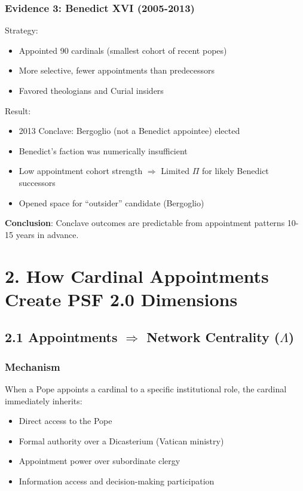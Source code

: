 \subsubsection{Evidence 3: Benedict XVI (2005-2013)}

Strategy:
\begin{itemize}
\item Appointed 90 cardinals (smallest cohort of recent popes)
\item More selective, fewer appointments than predecessors
\item Favored theologians and Curial insiders
\end{itemize}

Result:
\begin{itemize}
\item 2013 Conclave: Bergoglio (not a Benedict appointee) elected
\item Benedict's faction was numerically insufficient
\item Low appointment cohort strength $\Rightarrow$ Limited $\Pi$ for likely Benedict successors
\item Opened space for ``outsider'' candidate (Bergoglio)
\end{itemize}

\textbf{Conclusion}: Conclave outcomes are predictable from appointment patterns 10-15 years in advance.

\section{2. How Cardinal Appointments Create PSF 2.0 Dimensions}

\subsection{2.1 Appointments $\Rightarrow$ Network Centrality ($\Lambda$)}

\subsubsection{Mechanism}

When a Pope appoints a cardinal to a specific institutional role, the cardinal immediately inherits:
\begin{itemize}
\item Direct access to the Pope
\item Formal authority over a Dicasterium (Vatican ministry)
\item Appointment power over subordinate clergy
\item Information access and decision-making participation
\end{itemize}

